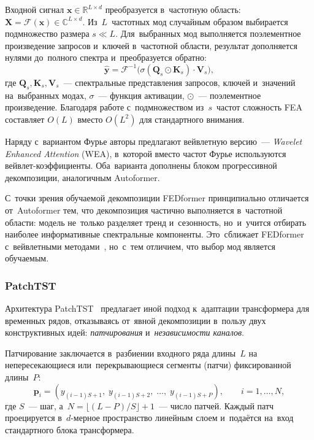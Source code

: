 Входной сигнал $\mathbf{x} \in \mathbb{R}^{L \times d}$
преобразуется в~частотную область:
$\mathbf{X} = \mathcal{F}(\mathbf{x}) \in \mathbb{C}^{L \times d}$.
Из~$L$~частотных мод случайным образом выбирается подмножество размера
$s \ll L$.  Для~выбранных мод выполняется поэлементное произведение
запросов и~ключей в~частотной области, результат дополняется нулями
до~полного спектра и~преобразуется обратно:
\begin{equation}
\label{eq:fedformer-fea}
\hat{\mathbf{y}} = \mathcal{F}^{-1}\!\bigl(\sigma(\mathbf{Q}_s \odot \mathbf{K}_s) \cdot \mathbf{V}_s\bigr),
\end{equation}
где $\mathbf{Q}_s, \mathbf{K}_s, \mathbf{V}_s$~--- спектральные
представления запросов, ключей и~значений на~выбранных модах, $\sigma$~---
функция активации, $\odot$~--- поэлементное произведение.  Благодаря
работе с~подмножеством из~$s$~частот сложность FEA составляет $O(L)$
вместо $O(L^2)$ для стандартного внимания.

Наряду с~вариантом Фурье авторы предлагают вейвлетную версию~---
\textit{Wavelet Enhanced Attention} (WEA), в~которой вместо частот
Фурье используются вейвлет-коэффициенты.  Оба~варианта дополнены
блоком прогрессивной декомпозиции, аналогичным Autoformer.

С~точки зрения обучаемой декомпозиции FEDformer принципиально отличается
от~Autoformer тем, что декомпозиция частично выполняется в~частотной
области: модель не~только разделяет тренд и~сезонность, но~и~учится
отбирать наиболее информативные спектральные компоненты.  Это~сближает
FEDformer с~вейвлетными методами~\cite{percival2000wavelet}, но~с~тем
отличием, что выбор мод является обучаемым.


\subsubsection{PatchTST}
\label{sssec:patchtst}

Архитектура PatchTST~\cite{nie2023patchtst} предлагает иной подход
к~адаптации трансформера для временных рядов, отказываясь от~явной
декомпозиции в~пользу двух конструктивных идей: \textit{патчирования}
и~\textit{независимости каналов}.

Патчирование заключается в~разбиении входного ряда длины~$L$ на
непересекающиеся или~перекрывающиеся сегменты (патчи) фиксированной
длины~$P$:
\begin{equation}
\label{eq:patching}
\mathbf{p}_i = (y_{(i-1)S+1},\; y_{(i-1)S+2},\; \ldots,\; y_{(i-1)S+P}), \qquad
i = 1, \ldots, N,
\end{equation}
где $S$~--- шаг, а~$N = \lfloor(L-P)/S\rfloor + 1$~--- число
патчей.  Каждый патч проецируется в~$d$-мерное пространство линейным
слоем и~подаётся на~вход стандартного блока трансформера.

